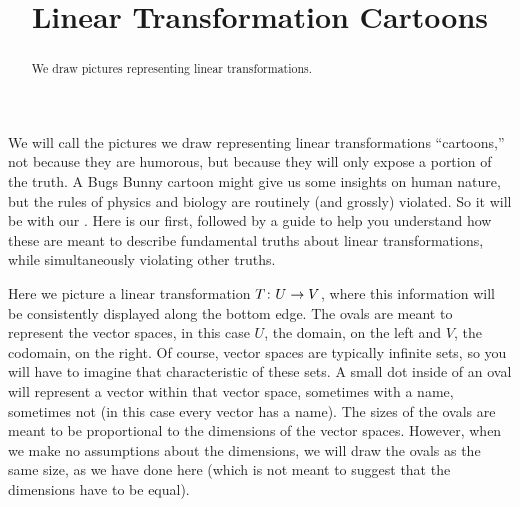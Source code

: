\documentclass{ximera}
\title{Linear Transformation Cartoons}
\begin{document}
\begin{abstract}
We draw pictures representing linear transformations.
\end{abstract}
\maketitle

We will call the pictures we draw representing linear transformations ``cartoons,'' not because they are humorous, but because they will only expose a portion of the truth.  A Bugs Bunny cartoon might give us some insights on human nature, but the rules of physics and biology are routinely (and grossly) violated.  So it will be with our .  Here is our first, followed by a guide to help you understand how these are meant to describe fundamental truths about linear transformations, while simultaneously violating other truths.

\begin{image}
\end{image}

Here we picture a linear transformation $T\colon U\rightarrow V$, where this
information will be consistently displayed along the bottom edge.  The
ovals are meant to represent the vector spaces, in this case $U$, the
domain, on the left and $V$, the codomain, on the right.  Of course,
vector spaces are typically infinite sets, so you will have to imagine
that characteristic of these sets.  A small dot inside of an oval will
represent a vector within that vector space, sometimes with a name,
sometimes not (in this case every vector has a name).  The sizes of
the ovals are meant to be proportional to the dimensions of the vector
spaces.  However, when we make no assumptions about the dimensions, we
will draw the ovals as the same size, as we have done here (which is
not meant to suggest that the dimensions have to be equal).
\end{document}
